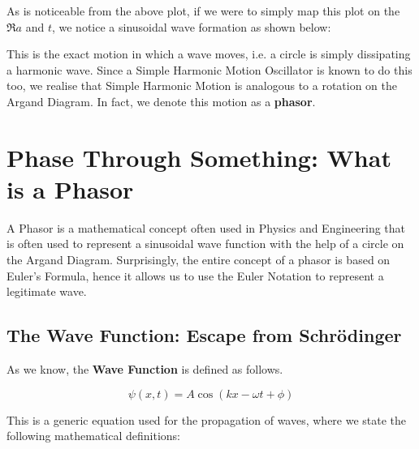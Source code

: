 \documentclass[a4paper,12pt,oneside]{book}
\begin{document}
As is noticeable from the above plot, if we were to simply map this plot on the $\Re{a}$ and $t$, we notice a sinusoidal wave formation as shown below:

\begin{center}
\end{center}

This is the exact motion in which a wave moves, i.e. a circle is simply dissipating a harmonic wave. Since a Simple Harmonic Motion Oscillator is known to do this too, we realise that Simple Harmonic Motion is analogous to a rotation on the Argand Diagram. In fact, we denote this motion as a \textbf{phasor}.


\section{Phase Through Something: What is a Phasor}

A Phasor is a mathematical concept often used in Physics and Engineering that is often used to represent a sinusoidal wave function with the help of a circle on the Argand Diagram. Surprisingly, the entire concept of a phasor is based on Euler's Formula, hence it allows us to use the Euler Notation to represent a legitimate wave. \\

\subsection{The Wave Function: Escape from Schrödinger}

As we know, the \textbf{Wave Function} is defined as follows.

\[ \psi(x, t) = A \cos(kx - \omega t + \phi) \]

This is a generic equation used for the propagation of waves, where we state the following mathematical definitions:
\end{document}
